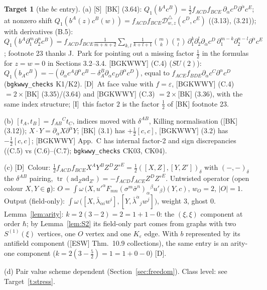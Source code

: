 \documentclass[11pt]{article}
\theoremstyle{definition}
\newtheorem{target}{Target}
\newcommand{\tr}{\operatorname{tr}}
\newcommand{\Sl}{\textup{[S]}}
\newcommand{\Dl}{\textup{[D]}}
\newcommand{\Il}{\textup{[I]}}
\begin{document}
\begin{target}[the $bc$ entry]\label{t:bc}
(a) \Sl\ [BK] (3.64): $Q_1(b^Ac^B)=\tfrac12f_{ACD}f_{BCE}\,\partial_{\dot\alpha}c^D\partial^{\dot\alpha}c^E$; at nonzero shift $Q_1(b^A(z)c^B(w))=f_{ACD}f_{BCE}\mathcal D^\triangle_{w,z}(c^D,c^E)$ ((3.13), (3.21)); with derivatives (B.5): $Q_1(b^A\partial_1^m\partial_2^nc^B)=f_{ACD}f_{BCE}\frac1{m+n+2}\sum_{k,l}\frac1{k+l+1}\binom mk\binom nl\,\partial_1^k\partial_2^l\partial_{\dot\alpha}c^D\,\partial_1^{m-k}\partial_2^{n-l}\partial^{\dot\alpha}c^E$; footnote 23 thanks J.~Park for pointing out a missing factor $\tfrac12$ in the formulas for $z=w=0$ in Sections 3.2--3.4. [BGKWWY] (C.4) ($SU(2)$): $Q_1(b_Ac^B)=-(\partial_\alpha c^A\partial^\alpha c^B-\delta^B_A\partial_\alpha c_D\partial^\alpha c^D)$, equal to $f_{ACE}f_{BDE}\partial_\alpha c^C\partial^\alpha c^D$ (\texttt{bgkwwy\_checks} K1/K2). \Dl\ At face value with $f=\varepsilon$, [BGKWWY] (C.4) $=2\times$[BK] (3.35)/(3.64) and [BGKWWY] (C.3) $=2\times$[BK] (3.36), with the same index structure; \Il\ this factor $2$ is the factor $\tfrac12$ of [BK] footnote 23.

(b) $[t_A,t_B]=f_{AB}{}^Ct_C$, indices moved with $\delta^{AB}$, Killing normalisation ([BK] (3.12)); $X\cdot Y=\partial_{\dot\alpha}X\partial^{\dot\alpha}Y$; [BK] (3.1) has $+\frac12[c,c]$, [BGKWWY] (3.2) has $-\frac12[c,c]$; [BGKWWY] App.~C has internal factor-2 and sign discrepancies ((C.5) vs (C.6)--(C.7); \texttt{bgkwwy\_checks} CK03, CK04).

(c) \Dl\ Colour: $\tfrac12f_{ACD}f_{BCE}X^AY^BZ^DZ'^E=\tfrac12([X,Z],[Y,Z'])_\delta$ with $(-,-)_\delta$ the $\delta^{AB}$ pairing, $\tr(\mathrm{ad}_Z\mathrm{ad}_{Z'})=-f_{ACD}f_{ACE}Z^DZ'^E$. Untwisted operator (open colour $X,Y\in\mathfrak g$): $O=\int\omega\,\big(X,u'^\alpha F_{mn}(\sigma^m\bar\sigma^n)_\alpha{}^\beta u'_\beta\big)(Y,c)$, $w_O=2$, $|O|=1$. Output (field-only): $\int\omega\,\big([X,\bar\lambda_{\dot\alpha i}w^i],[Y,\bar\lambda^{\dot\alpha}{}_jw^j]\big)$, weight $3$, ghost $0$. Lemma~\ref{lem:arity}: $k=2(3-2)=2=1+1-0$: the $(\xi,\xi)$ component at order $\hbar$; by Lemma~\ref{lem:S2} its field-only part comes from graphs with two $S^{(1)}(\xi)$ vertices, one $O$ vertex and one $K_\varepsilon$ edge. With $b$ represented by its antifield component ([ESW] Thm.~10.9 collections), the same entry is an arity-one component ($k=2(3-\tfrac52)=1=1+0-0$) \Dl.

(d) Pair value scheme dependent (Section~\ref{sec:freedom}). Class level: see Target~\ref{t:stress}.
\end{target}
\end{document}
